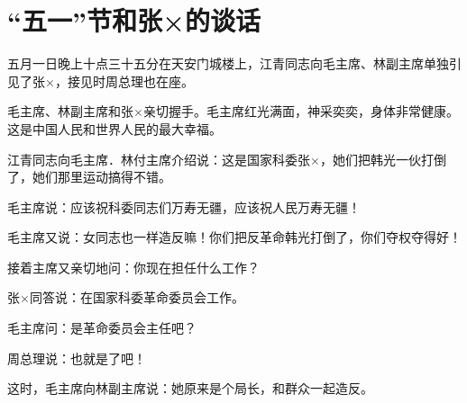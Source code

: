 \section[ “五一”节和张×的谈话（一九六七年五月一日）]{ “五一”节和张×的谈话}


五月一日晚上十点三十五分在天安门城楼上，江青同志向毛主席、林副主席单独引见了张×，接见时周总理也在座。

毛主席、林副主席和张×亲切握手。毛主席红光满面，神采奕奕，身体非常健康。这是中国人民和世界人民的最大幸福。

江青同志向毛主席．林付主席介绍说：这是国家科委张×，她们把韩光一伙打倒了，她们那里运动搞得不错。

毛主席说：应该祝科委同志们万寿无疆，应该祝人民万寿无疆！

毛主席又说：女同志也一样造反嘛！你们把反革命韩光打倒了，你们夺权夺得好！

接着主席又亲切地问：你现在担任什么工作？

张×同答说：在国家科委革命委员会工作。

毛主席问：是革命委员会主任吧？

周总理说：也就是了吧！

这时，毛主席向林副主席说：她原来是个局长，和群众一起造反。


